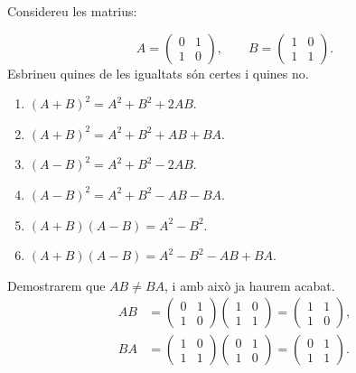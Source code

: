\begin{exercise}[1.8.5]
    Considereu les matrius:

    \begin{equation}
        A = \begin{pmatrix}
        0 & 1 \\
        1 & 0 
        \end{pmatrix},\qquad B = \begin{pmatrix}
        1& 0 \\
        1 & 1 
        \end{pmatrix}.
    \end{equation}
    Esbrineu quines de les igualtats són certes i quines no.

    \begin{enumerate}
    \item $(A+B)^2 = A^2+B^2+2AB$.
    \item $(A+B)^2 = A^2+B^2+AB + BA$.
    \item $(A-B)^2=A^2+B^2-2AB$.
    \item $(A-B)^2 = A^2+B^2-AB - BA$.
    \item $(A+B)(A-B) = A^2-B^2$.
    \item $(A+B)(A-B) = A^2-B^2-AB + BA$.
    \end{enumerate}
\end{exercise}

\begin{solution}
Demostrarem que $AB \neq BA$, i amb això ja haurem acabat.
\begin{align}
AB &= \begin{pmatrix}
        0 & 1 \\
        1 & 0 
        \end{pmatrix}\begin{pmatrix}
        1& 0 \\
        1 & 1 
        \end{pmatrix} = \begin{pmatrix}
        1& 1 \\
        1 & 0 
        \end{pmatrix},\\
BA &= \begin{pmatrix}
        1& 0 \\
        1 & 1 
        \end{pmatrix}\begin{pmatrix}
        0 & 1 \\
        1 & 0 
        \end{pmatrix} = \begin{pmatrix}
        0& 1 \\
        1 & 1 
        \end{pmatrix}.
\end{align}
\end{solution}


